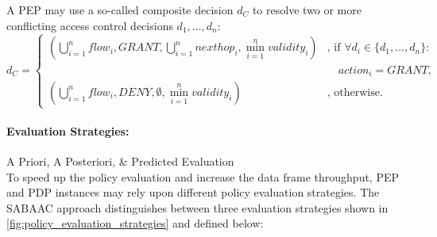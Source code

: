 A PEP may use a so-called composite decision $d_C$ to resolve two or more conflicting access control decisions $d_1, \dots, d_n$:
\[
    d_C =
    \begin{cases}
        (\bigcup_{i=1}^{n}flow_i, GRANT, \bigcup_{i=1}^{n}nexthop_i, \min_{i=1}^{n}validity_i) & \text{, if } \forall d_i \in \{d_1, \dots, d_n\}:\\
        & \quad action_i = GRANT,\\
        (\bigcup_{i=1}^{n}flow_i, DENY, \emptyset, \min_{i=1}^{n}validity_i) & \text{, otherwise.}
    \end{cases}
\]

\paragraph{Evaluation Strategies:} A Priori, A Posteriori, \& Predicted Evaluation\\
To speed up the policy evaluation and increase the data frame throughput, PEP and PDP instances may rely upon different policy evaluation strategies.
The SABAAC approach distinguishes between three evaluation strategies shown in \autoref{fig:policy_evaluation_strategies} and defined below:
